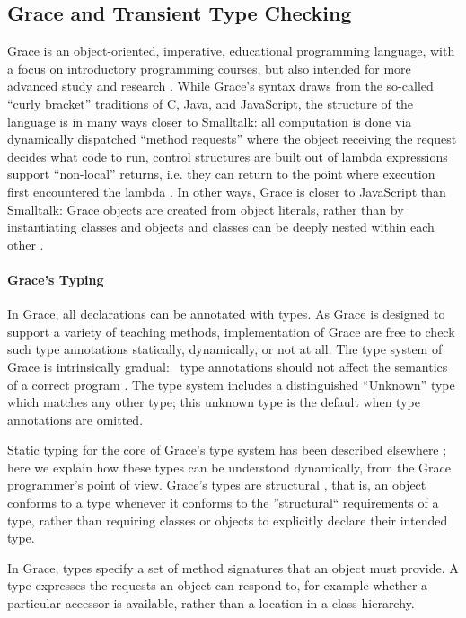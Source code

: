 \documentclass[sigplan,10pt,review,screen]{acmart}\settopmatter{printfolios=true}
\begin{document}
\subsection{Grace and Transient Type Checking}

Grace is an object-oriented, imperative, educational programming
language, with a focus on introductory programming
courses, but also intended for more advanced study and research \citep{graceOnward12,graceSigcse13}.
%
While Grace's syntax draws
from the so-called ``curly bracket'' traditions of C, Java, and
JavaScript, the structure of the language
is in many ways closer to Smalltalk:
all computation is done via dynamically dispatched  ``method requests''
where the object receiving the request decides what code to run,
control structures are built out of lambda expressions support ``non-local'' returns, i.e. they can return to the point where execution first encountered the lambda \citep{bluebook}.  In
other ways, Grace is closer to JavaScript than Smalltalk: Grace
objects are created from object literals, rather than by
instantiating classes \citep{Black2007-emeraldHOPL,JonesECOOP2016} and
objects and classes can be deeply nested within each 
other \citep{betabook}.

\paragraph{Grace's Typing}
In Grace, all declarations can be annotated with types.
As Grace is designed to support a variety of teaching methods, implementation of Grace are free to check such type annotations  statically, dynamically, or not at all.
The type system of Grace is intrinsically gradual:%
%
~type annotations should not affect the semantics of a correct
program \citep{XXXSiek2015}. The type system
includes a distinguished ``{Unknown}'' type which matches any other type; this unknown type is the default when type annotations are omitted.

Static typing for the core of Grace's type system has been described
elsewhere \citep{TimJonesThesis};
here we explain how
these types can be understood 
dynamically, from the Grace programmer's point of view.
Grace's types are structural \citep{graceOnward12},
that is, an object conforms to a type whenever it conforms to the ''structural`` requirements of a type,
rather than requiring classes or objects to explicitly declare their intended type.

In Grace, types specify a set of method signatures that an object must provide. A type expresses the requests an object can respond to, for example whether a particular accessor is available, rather than a location in a class hierarchy.
\end{document}
